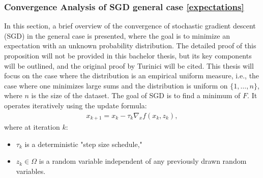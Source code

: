 \newpage
\subsubsection{Convergence Analysis of SGD general case \ref{expectations}}
In this section, a brief overview of the convergence of stochastic gradient descent (SGD) in the general case is presented, where the goal is to minimize an expectation with an unknown probability distribution. The detailed proof of this proposition will not be provided in this bachelor thesis, but its key components will be outlined, and the original proof by Turinici \cite{turinici2021convergence} will be cited. This thesis will focus on the case where the distribution is an empirical uniform measure, i.e., the case where one minimizes large sums and the distribution is uniform on $\{1,\dots,n\}$, where $n$ is the size of the dataset.
The goal of SGD is to find a minimum of $F$. It operates iteratively using the update formula:
\begin{align}
x_{k+1} = x_{k} - \tau_{k}\nabla_{x}f(x_{k}, z_{k}), \tag{2}
\end{align}
where at iteration $k$:
\begin{itemize}
\item $\tau_k$ is a deterministic "step size schedule,"
\item $z_k \in \Omega$ is a random variable independent of any previously drawn random variables.
\end{itemize}

